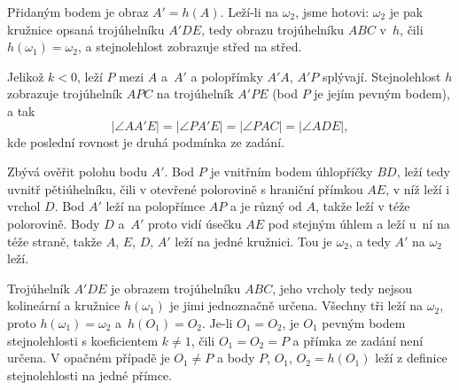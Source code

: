 {    Přidaným bodem je obraz $A' = h(A)$. Leží-li na $\omega_2$, jsme hotovi: $\omega_2$ je pak kružnice opsaná trojúhelníku $A'DE$, tedy obrazu trojúhelníku $ABC$ v~$h$, čili $h(\omega_1) = \omega_2$, a stejnolehlost zobrazuje střed na střed.

    Jelikož $k < 0$, leží $P$ mezi $A$ a~$A'$ a polopřímky $A'A$, $A'P$ splývají. Stejnolehlost $h$ zobrazuje trojúhelník $APC$ na trojúhelník $A'PE$ (bod $P$ je jejím pevným bodem), a tak
    $$
    |\angle AA'E| = |\angle PA'E| = |\angle PAC| = |\angle ADE|,
    $$
    kde poslední rovnost je druhá podmínka ze zadání.

    Zbývá ověřit polohu bodu $A'$. Bod $P$ je vnitřním bodem úhlopříčky $BD$, leží tedy uvnitř pětiúhelníku, čili v otevřené polorovině s hraniční přímkou $AE$, v níž leží i vrchol $D$. Bod $A'$ leží na polopřímce $AP$ a je různý od $A$, takže leží v téže polorovině. Body $D$ a~$A'$ proto vidí úsečku $AE$ pod stejným úhlem a leží u~ní na téže straně, takže $A$, $E$, $D$, $A'$ leží na jedné kružnici. Tou je $\omega_2$, a tedy $A'$ na $\omega_2$ leží.

    Trojúhelník $A'DE$ je obrazem trojúhelníku $ABC$, jeho vrcholy tedy nejsou kolineární a kružnice $h(\omega_1)$ je jimi jednoznačně určena. Všechny tři leží na $\omega_2$, proto $h(\omega_1) = \omega_2$ a~$h(O_1) = O_2$. Je-li $O_1 = O_2$, je $O_1$ pevným bodem stejnolehlosti s koeficientem $k \neq 1$, čili $O_1 = O_2 = P$ a přímka ze zadání není určena. V opačném případě je $O_1 \neq P$ a body $P$, $O_1$, $O_2 = h(O_1)$ leží z definice stejnolehlosti na jedné přímce.
}

